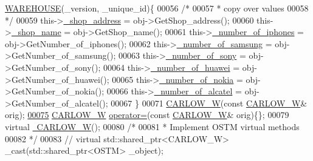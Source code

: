 \begin{DoxyCode}
      \hyperlink{class_w_a_r_e_h_o_u_s_e}{WAREHOUSE}(\_version, \_unique\_id)\{
00056         \textcolor{comment}{/*}
00057 \textcolor{comment}{         * copy over values}
00058 \textcolor{comment}{         */}
00059         this->\hyperlink{class_c_a_r_l_o_w___w_acaa886b26f5a60d500f13709340d34cf_acaa886b26f5a60d500f13709340d34cf}{\_shop\_address} = obj->GetShop\_address();
00060         this->\hyperlink{class_c_a_r_l_o_w___w_ad3ae4ca82f06287d8ad5bec07a43561a_ad3ae4ca82f06287d8ad5bec07a43561a}{\_shop\_name} = obj->GetShop\_name();
00061         this->\hyperlink{class_c_a_r_l_o_w___w_aff9e9a986b6390d6fa51f52d43a8c0e8_aff9e9a986b6390d6fa51f52d43a8c0e8}{\_number\_of\_iphones} = obj->GetNumber\_of\_iphones();
00062         this->\hyperlink{class_c_a_r_l_o_w___w_ae47f54289c630e38341ce8b2c8decf0f_ae47f54289c630e38341ce8b2c8decf0f}{\_number\_of\_samsung} = obj->GetNumber\_of\_samsung();
00063         this->\hyperlink{class_c_a_r_l_o_w___w_a080de2e63290db84a0b9898682b74f6e_a080de2e63290db84a0b9898682b74f6e}{\_number\_of\_sony} = obj->GetNumber\_of\_sony();
00064         this->\hyperlink{class_c_a_r_l_o_w___w_acc2837ed943bb51134e5878e818970fd_acc2837ed943bb51134e5878e818970fd}{\_number\_of\_huawei} = obj->GetNumber\_of\_huawei();
00065         this->\hyperlink{class_c_a_r_l_o_w___w_ac4c7e47711cc4c9e0bc01fc37cabe7d1_ac4c7e47711cc4c9e0bc01fc37cabe7d1}{\_number\_of\_nokia} = obj->GetNumber\_of\_nokia();
00066         this->\hyperlink{class_c_a_r_l_o_w___w_acf1f9888b2ac011cd0e8bb49b10abd91_acf1f9888b2ac011cd0e8bb49b10abd91}{\_number\_of\_alcatel} = obj->GetNumber\_of\_alcatel();
00067     \}
00071     \hyperlink{class_c_a_r_l_o_w___w_a8ae6ca6f4db7ea5240322fd27824c55a_a8ae6ca6f4db7ea5240322fd27824c55a}{CARLOW\_W}(\textcolor{keyword}{const} \hyperlink{class_c_a_r_l_o_w___w}{CARLOW\_W}& orig);
\hypertarget{_c_a_r_l_o_w___w_8h_source.tex_l00075}{}\hyperlink{class_c_a_r_l_o_w___w_a38c83795abf1751b3e122c74494f4586_a38c83795abf1751b3e122c74494f4586}{00075}     \hyperlink{class_c_a_r_l_o_w___w}{CARLOW\_W} \hyperlink{class_c_a_r_l_o_w___w_a38c83795abf1751b3e122c74494f4586_a38c83795abf1751b3e122c74494f4586}{operator=}(\textcolor{keyword}{const} \hyperlink{class_c_a_r_l_o_w___w}{CARLOW\_W}& orig)\{\};
00079     \textcolor{keyword}{virtual} \hyperlink{class_c_a_r_l_o_w___w_aa628d46e58dfd0517f24499eca88138b_aa628d46e58dfd0517f24499eca88138b}{~CARLOW\_W}();
00080     \textcolor{comment}{/*}
00081 \textcolor{comment}{     * Implement OSTM virtual methods}
00082 \textcolor{comment}{     */}
00083    \textcolor{comment}{// virtual std::shared\_ptr<CARLOW\_W> \_cast(std::shared\_ptr<OSTM> \_object);}

\end{DoxyCode}

